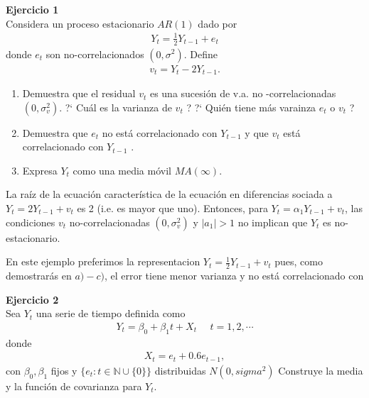 \documentclass[a4paper, 11pt]{article}
\newenvironment{problem}[2][Ejercicio]
{ \begin{mdframed}[backgroundcolor= red!50] \textbf{#1 #2} \\}
	{  \end{mdframed}}
\begin{document}
	\setlength{\parskip}{\medskipamount}
	\setlength{\parindent}{0pt}
\begin{problem}{1}
    Considera un proceso estacionario $AR(1)$ dado por 
    \begin{align*}
        Y_t = \frac{1}{2}Y_{t-1} + e_t 
    \end{align*}
    donde $e_t$ son no-correlacionados $(0,\sigma^2)$. Define 
    \begin{align*}
        v_t = Y_t - 2Y_{t-1}.
    \end{align*}
    \begin{enumerate}
        \item Demuestra que el residual $v_t$ es una sucesión de v.a. no -correlacionadas $(0, \sigma_v^2)$. ?` Cuál es la varianza de $v_t$ ? ?` Quién tiene más varainza $e_t$ o $v_t$ ?
        \item Demuestra que $e_t$ no está correlacionado con $Y_{t-1}$ y que $v_t$ está correlacionado con $Y_{t-1}$ .
        \item Expresa $Y_t$ como una media móvil $MA(\infty)$.
    \end{enumerate}

    La raíz de la ecuación característica de la ecuación en diferencias sociada a $Y_t = 2 Y_{t-1} + v_{t }$ es 2 (i.e. es mayor que uno). Entonces, para $ Y_t = \alpha_1 Y_{t-1} + v_t$, las condiciones $v_t$ no-correlacionadas $(0, \sigma^2_v )$ y $|a_1| > 1$ no implican que $Y_t$ es no-estacionario.

    En este ejemplo preferimos la representacion $Y_t = \frac{1}{2}Y_{t-1} + v_t$ pues, como demostrarás en $a)-c)$, el error tiene menor varianza y no está correlacionado con 
    
    
    
    
    
\end{problem}

\begin{problem}{2}
    Sea $Y_t$ una serie de tiempo definida como 
    \begin{align*}
        Y_t = \beta_0 + \beta_1 t + X_t \:\:\:\:\:\: t = 1,2, \cdots
    \end{align*}
    donde
    \begin{align*}
        X_t = e_t + 0.6 e_{t-1},
    \end{align*}
    con $\beta_0,\beta_1$ fijos y $\{e_t: t\in \mathbb{N}\cup \{0\} \} $ distribuidas $N(0,sigma^2)$ Construye la media y la función de covarianza para $Y_t$.
\end{problem}
\end{document}
